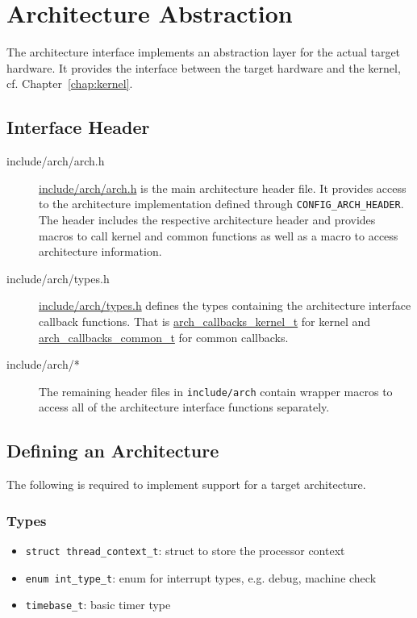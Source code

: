 \chapter{Architecture Abstraction\label{chap:arch}}
	The architecture interface implements an abstraction layer for the actual target hardware. It provides the interface between the target hardware and the kernel, cf. Chapter~\ref{chap:kernel}.


\section{Interface Header}
	\begin{description}
	\item[include/arch/arch.h]
		\hyperref[arch_8h]{include/arch/arch.h} is the main architecture header file. It provides access to the architecture implementation defined through \lstinline{CONFIG_ARCH_HEADER}. The header includes the respective architecture header and provides macros to call kernel and common functions as well as a macro to access architecture information.	
		

	\item[include/arch/types.h]
		\hyperref[arch_2types_8h]{include/arch/types.h} defines the types containing the architecture interface callback functions. That is \hyperref[structarch__callbacks__kernel__t]{arch\_callbacks\_kernel\_t} for kernel and \hyperref[structarch__callbacks__common__t]{arch\_callbacks\_common\_t} for common callbacks.

	\item[include/arch/*]
		The remaining header files in \lstinline{include/arch} contain wrapper macros to access all of the architecture interface functions separately.
	\end{description}


\section{Defining an Architecture}
	The following is required to implement support for a target architecture.

	\subsection{Types}
		\begin{itemize}
			\item \lstinline{struct thread_context_t}: struct to store the processor context
			\item \lstinline{enum int_type_t}: enum for interrupt types, e.g. debug, machine check
			\item \lstinline{timebase_t}: basic timer type
		\end{itemize}

